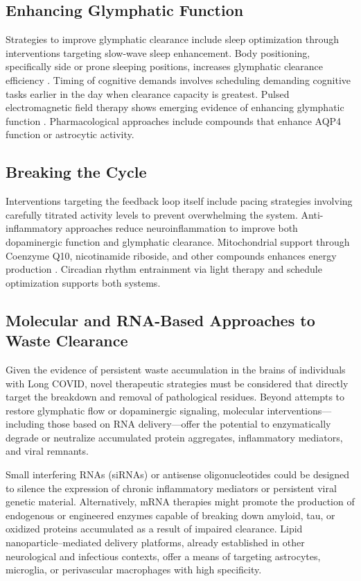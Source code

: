 \documentclass[12pt]{article}
\begin{document}
\subsection{Enhancing Glymphatic Function}

Strategies to improve glymphatic clearance include sleep optimization through interventions targeting slow-wave sleep enhancement. Body positioning, specifically side or prone sleeping positions, increases glymphatic clearance efficiency \citep{Lee2015}. Timing of cognitive demands involves scheduling demanding cognitive tasks earlier in the day when clearance capacity is greatest. Pulsed electromagnetic field therapy shows emerging evidence of enhancing glymphatic function \citep{Dragicevic2021}. Pharmacological approaches include compounds that enhance AQP4 function or astrocytic activity.

\subsection{Breaking the Cycle}

Interventions targeting the feedback loop itself include pacing strategies involving carefully titrated activity levels to prevent overwhelming the system. Anti-inflammatory approaches reduce neuroinflammation to improve both dopaminergic function and glymphatic clearance. Mitochondrial support through Coenzyme Q10, nicotinamide riboside, and other compounds enhances energy production \citep{stefano2021mitochondria}. Circadian rhythm entrainment via light therapy and schedule optimization supports both systems.

\subsection{Molecular and RNA-Based Approaches to Waste Clearance}

Given the evidence of persistent waste accumulation in the brains of individuals with Long COVID, novel therapeutic strategies must be considered that directly target the breakdown and removal of pathological residues. Beyond attempts to restore glymphatic flow or dopaminergic signaling, molecular interventions—including those based on RNA delivery—offer the potential to enzymatically degrade or neutralize accumulated protein aggregates, inflammatory mediators, and viral remnants.

Small interfering RNAs (siRNAs) or antisense oligonucleotides could be designed to silence the expression of chronic inflammatory mediators or persistent viral genetic material. Alternatively, mRNA therapies might promote the production of endogenous or engineered enzymes capable of breaking down amyloid, tau, or oxidized proteins accumulated as a result of impaired clearance. Lipid nanoparticle–mediated delivery platforms, already established in other neurological and infectious contexts, offer a means of targeting astrocytes, microglia, or perivascular macrophages with high specificity.
\end{document}
